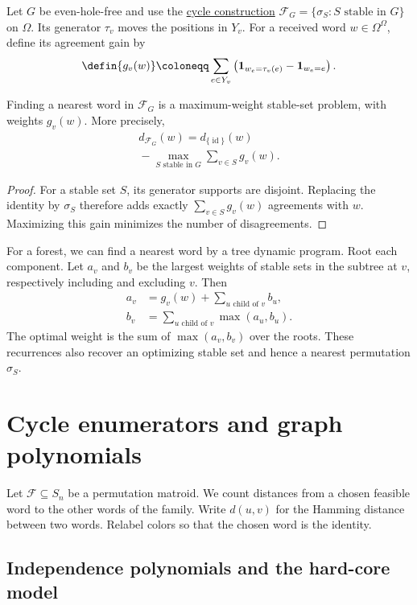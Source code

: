 Let $G$ be even-hole-free and use the
\href{stable-sets.htm#contactConstruction}{cycle construction}
$\mathcal F_G=\{\sigma_S:S\text{ stable in }G\}$ on $\Omega$.
Its generator $\tau_v$ moves the positions in $Y_v$.
For a received word $w\in\Omega^\Omega$, define its agreement gain by
\[
 \defin{g_v(w)}\coloneqq
 \sum_{e\in Y_v}
 \left(\mathbf1_{w_e=\tau_v(e)}-\mathbf1_{w_e=e}\right).
\]

\begin{proposition}
Finding a nearest word in $\mathcal F_G$ is a maximum-weight stable-set
problem, with weights $g_v(w)$. More precisely,
\[
 \begin{gathered}
 d_{\mathcal F_G}(w)=d_{\{\operatorname{id}\}}(w)\\
 {}-\max_{S\text{ stable in }G}\sum_{v\in S}g_v(w).
 \end{gathered}
\]
\end{proposition}

\begin{proof}
For a stable set $S$, its generator supports are disjoint. Replacing
the identity by $\sigma_S$ therefore adds exactly
$\sum_{v\in S}g_v(w)$ agreements with $w$. Maximizing this gain
minimizes the number of disagreements.
\end{proof}

For a forest, we can find a nearest word by a tree dynamic program.
Root each component. Let $a_v$ and $b_v$ be the largest weights of
stable sets in the subtree at $v$, respectively including and excluding
$v$. Then
\[
 \begin{aligned}
 a_v&=g_v(w)+\sum_{u\text{ child of }v}b_u,\\
 b_v&=\sum_{u\text{ child of }v}\max(a_u,b_u).
 \end{aligned}
\]
The optimal weight is the sum of $\max(a_v,b_v)$ over the roots.
These recurrences also recover an optimizing stable set and hence
a nearest permutation $\sigma_S$.

\section[cycleEnumerators]{Cycle enumerators and graph polynomials}

Let $\mathcal F\subseteq S_n$ be a permutation matroid. We count distances
from a chosen feasible word to the other words of the family.
Write $d(u,v)$ for the Hamming distance between two words.
Relabel colors so that the chosen word is the identity.

\subsection[cycleIndependence]{Independence polynomials and the hard-core model}

